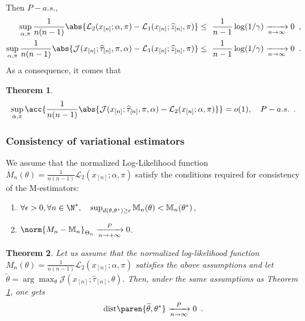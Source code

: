 \documentclass[11pt]{article}
\newtheorem{thm}{Theorem}[section]
\newcommand{\xn}{x_{[n]}}
\renewcommand{\L}{\mathcal{L}}
\newcommand{\J}{\mathcal{J}}
\newcommand{\znh}{\widehat{z}_{[n]}}
\newcommand{\tah}{\widehat{\tau}}
\newcommand{\tahn}{\tah_{[n]}}
\begin{document}
%
Then $P-a.s.$,
\begin{align*}
\sup_{\alpha,\pi}\frac{1}{n(n-1)}\abs{\L_2(\xn; \alpha, \pi)-\L_1(\xn; \znh,\pi)} &\leq\  \frac{1}{n-1}\log(1/\gamma) \xrightarrow[n\to\infty]{} 0 \enspace,\\
\sup_{\alpha,\pi}\frac{1}{n(n-1)}\abs{\J(\xn; \tahn, \pi, \alpha)-\L_1(\xn; \znh,\pi)} &\leq\  \frac{1}{n-1}\log(1/\gamma) \xrightarrow[n\to\infty]{} 0 \enspace.
\end{align*}
%
As a consequence, it comes that
\begin{thm}\label{thm.uniform.P-as.Var.Likelihood}
\begin{align*}
        \sup_{\alpha,\pi}\acc{ \frac{1}{n(n-1)}\abs{\J(\xn; \tahn, \pi, \alpha)- \L_2(\xn; \alpha, \pi)}} = o(1),\quad P-a.s.\enspace.
\end{align*}
\end{thm}






\subsubsection{Consistency of variational estimators}

We assume that the normalized Log-Likelihood function $M_n(\theta)=\frac{1}{n(n-1)}\L_2(\xn;\alpha,\pi)$  satisfy the conditions required for consistency of the M-estimators:

\begin{enumerate}
        \item $\forall \epsilon>0, \forall n\in\N^*,\quad \sup_{d(\theta,\theta^*) \ge \epsilon } \mathbb{M}_n(\theta)<\mathbb{M}_n(\theta^*)$,
        \item $\norm{M_n-\mathbb{M}_n}_{\Theta_n}\xrightarrow[n\to +\infty]{P}0$.
\end{enumerate}


\begin{thm}\label{thm.consist.Var}
Let us assume that the normalized log-likelihood function $M_n(\theta)=\frac{1}{n(n-1)}\L_2(\xn;\alpha,\pi)$ satisfies the above assumptions and let  $\widetilde{\theta}=\arg \max_{\theta} \J(\xn; \tahn,\theta).$
%
Then, under the same assumptions as Theorem \ref{thm.uniform.P-as.Var.Likelihood}, one gets
\begin{align*}
\mathrm{dist}\paren{\widetilde{\theta},\theta^*} \xrightarrow[n\to \infty]{P}0\enspace.
\end{align*}
\end{thm}
\end{document}
